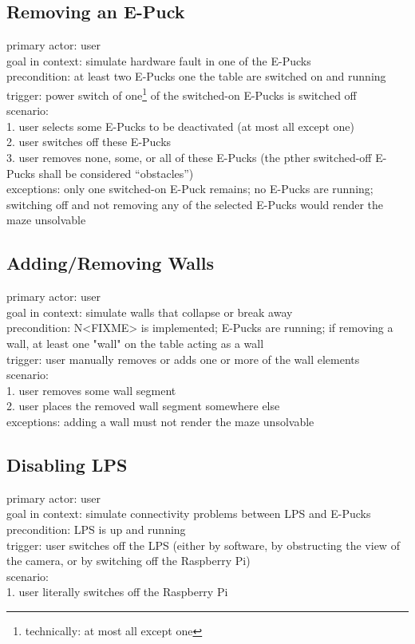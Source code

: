 \documentclass[a4paper,parskip,headheight=38pt]{scrartcl} %
\begin{document}
\subsection{Removing an E-Puck}
primary actor: user \\
goal in context: simulate hardware fault in one of the E-Pucks \\
precondition: at least two E-Pucks one the table are switched on and running \\
trigger: power switch of one\footnote{technically: at most all except one} of the switched-on E-Pucks is switched off \\
scenario: \\
1. user selects some E-Pucks to be deactivated (at most all except one) \\
2. user switches off these E-Pucks \\
3. user removes none, some, or all of these E-Pucks (the pther switched-off E-Pucks shall be considered \enquote{obstacles}) \\
exceptions: only one switched-on E-Puck remains; no E-Pucks are running; switching off and not removing any of the selected E-Pucks would render the maze unsolvable \\

\subsection{Adding/Removing Walls}
primary actor: user \\
goal in context: simulate walls that collapse or break away \\
precondition: N<FIXME> is implemented; E-Pucks are running; if removing a wall, at least one "wall" on the table acting as a wall \\
trigger: user manually removes or adds one or more of the wall elements \\
scenario: \\
1. user removes some wall segment \\
2. user places the removed wall segment somewhere else \\
exceptions: adding a wall must not render the maze unsolvable \\

\subsection{Disabling LPS}
primary actor: user \\
goal in context: simulate connectivity problems between LPS and E-Pucks \\
precondition: LPS is up and running \\
trigger: user switches off the LPS (either by software, by obstructing the view of the camera, or by switching off the Raspberry Pi) \\
scenario: \\
1. user literally switches off the Raspberry Pi \\
\end{document}
